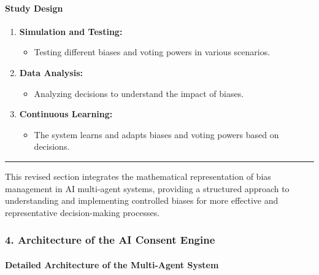 \hypertarget{study-design}{%
\paragraph{Study Design}\label{study-design}}

\begin{enumerate}
\def\labelenumi{\arabic{enumi}.}
\item
  \textbf{Simulation and Testing:}

  \begin{itemize}
  \tightlist
  \item
    Testing different biases and voting powers in various scenarios.
  \end{itemize}
\item
  \textbf{Data Analysis:}

  \begin{itemize}
  \tightlist
  \item
    Analyzing decisions to understand the impact of biases.
  \end{itemize}
\item
  \textbf{Continuous Learning:}

  \begin{itemize}
  \tightlist
  \item
    The system learns and adapts biases and voting powers based on
    decisions.
  \end{itemize}
\end{enumerate}

\begin{center}\rule{0.5\linewidth}{0.5pt}\end{center}

This revised section integrates the mathematical representation of bias
management in AI multi-agent systems, providing a structured approach to
understanding and implementing controlled biases for more effective and
representative decision-making processes.

\hypertarget{architecture-of-the-ai-consent-engine}{%
\subsubsection{4. Architecture of the AI Consent
Engine}\label{architecture-of-the-ai-consent-engine}}

\hypertarget{detailed-architecture-of-the-multi-agent-system}{%
\paragraph{Detailed Architecture of the Multi-Agent
System}\label{detailed-architecture-of-the-multi-agent-system}}

